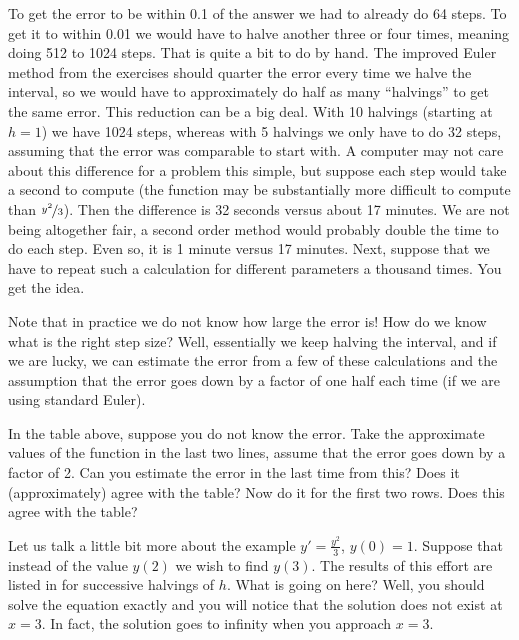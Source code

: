 \documentclass{ximera}
\begin{document}
To get the error to be within 0.1 of the answer we had to already do 64 steps.  To get it to within 0.01 we would have to halve another three or four times, meaning doing 512 to 1024 steps.  That is quite a bit to do by hand.  The improved Euler method from the exercises should quarter the error every time we halve the interval, so we would have to approximately do half as many ``halvings'' to get the same error.  This reduction can be a big deal.  With 10 halvings (starting at $h=1$) we have 1024 steps, whereas with 5 halvings we only have to do 32 steps, assuming that the error was comparable to start with.  A computer may not care about this difference for a problem this simple, but suppose each step would take a second to compute (the function may be substantially more difficult to compute than $\nicefrac{y^2}{3}$).  Then the difference is 32 seconds versus about 17 minutes. We are not being altogether fair, a second order method would probably double the time to do each step.  Even so, it is 1 minute versus 17 minutes. Next, suppose that we have to repeat such a calculation for different parameters a thousand times.  You get the idea.

Note that in practice we do not know how large the error is! How do we know what is the right step size?  Well, essentially we keep halving the interval, and if we are lucky, we can estimate the error from a few of these calculations and the assumption that the error goes down by a factor of one half each time (if we are using standard Euler).

\begin{exercise}
    In the table above, suppose you do not know the error.  Take the approximate values of the function in the last two lines, assume that the error goes down by a factor of 2.  Can you estimate the error in the last time from this?  Does it (approximately) agree with the table?  Now do it for the first two rows.  Does this agree with the table?
\end{exercise}

Let us talk a little bit more about the example $y' = \frac{y^2}{3}$, $y(0) = 1$.  Suppose that instead of the value $y(2)$ we wish to find $y(3)$. The results of this effort are listed in  for successive halvings of $h$.  What is going on here?  Well, you should solve the equation exactly and you will notice that the solution does not exist at $x=3$.  In fact, the solution goes to infinity when you approach $x=3$.
\end{document}
